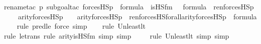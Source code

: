 \begin{isabellebody}
{\isacharparenleft}{\kern0pt}rename{\isacharunderscore}{\kern0pt}tac\ p{\isacharcomma}{\kern0pt}\ subgoal{\isacharunderscore}{\kern0pt}tac\ {\isachardoublequoteopen}forcesHS{\isacharprime}{\kern0pt}{\isacharparenleft}{\kern0pt}p{\isacharparenright}{\kern0pt}\ {\isasymin}\ formula\ {\isasymand}\ is{\isacharunderscore}{\kern0pt}HS{\isacharunderscore}{\kern0pt}fm{\isacharparenleft}{\kern0pt}{}{\isacharcomma}{\kern0pt}\ {}{\isacharparenright}{\kern0pt}\ {\isasymin}\ formula\ {\isasymand}\ ren{\isacharparenleft}{\kern0pt}forcesHS{\isacharprime}{\kern0pt}{\isacharparenleft}{\kern0pt}p{\isacharparenright}{\kern0pt}{\isacharparenright}{\kern0pt}\ {\isacharbackquote}{\kern0pt}\ {\isacharparenleft}{\kern0pt}{}\ {\isasymunion}\ arity{\isacharparenleft}{\kern0pt}forcesHS{\isacharprime}{\kern0pt}{\isacharparenleft}{\kern0pt}p{\isacharparenright}{\kern0pt}{\isacharparenright}{\kern0pt}{\isacharparenright}{\kern0pt}\ {\isacharbackquote}{\kern0pt}\ {\isacharparenleft}{\kern0pt}{}\ {\isasymunion}\ arity{\isacharparenleft}{\kern0pt}forcesHS{\isacharprime}{\kern0pt}{\isacharparenleft}{\kern0pt}p{\isacharparenright}{\kern0pt}{\isacharparenright}{\kern0pt}{\isacharparenright}{\kern0pt}\ {\isacharbackquote}{\kern0pt}\ ren{\isacharunderscore}{\kern0pt}forcesHS{\isacharunderscore}{\kern0pt}forall{\isacharparenleft}{\kern0pt}arity{\isacharparenleft}{\kern0pt}forcesHS{\isacharprime}{\kern0pt}{\isacharparenleft}{\kern0pt}p{\isacharparenright}{\kern0pt}{\isacharparenright}{\kern0pt}{\isacharparenright}{\kern0pt}\ {\isasymin}\ formula{\isachardoublequoteclose}{\isacharparenright}{\kern0pt}\isanewline
\ \ \ \isamarkupfalse%
{\isacharparenleft}{\kern0pt}rule\ pred{\isacharunderscore}{\kern0pt}le{\isacharcomma}{\kern0pt}\ force{\isacharcomma}{\kern0pt}\ simp{\isacharparenright}{\kern0pt}\isanewline
\ \ \ \isamarkupfalse%
{\isacharparenleft}{\kern0pt}rule\ Un{\isacharunderscore}{\kern0pt}least{\isacharunderscore}{\kern0pt}lt{\isacharparenright}{\kern0pt}\isanewline
\ \ \ \ \isamarkupfalse%
{\isacharparenleft}{\kern0pt}rule\ le{\isacharunderscore}{\kern0pt}trans{\isacharcomma}{\kern0pt}\ rule\ arity{\isacharunderscore}{\kern0pt}is{\isacharunderscore}{\kern0pt}HS{\isacharunderscore}{\kern0pt}fm{\isacharcomma}{\kern0pt}\ simp{\isacharcomma}{\kern0pt}\ simp{\isacharparenright}{\kern0pt}\isanewline
\ \ \ \ \isamarkupfalse%
{\isacharparenleft}{\kern0pt}rule\ Un{\isacharunderscore}{\kern0pt}least{\isacharunderscore}{\kern0pt}lt{\isacharcomma}{\kern0pt}\ simp{\isacharcomma}{\kern0pt}\ simp{\isacharparenright}{\kern0pt}\isanewline

\end{isabellebody}
